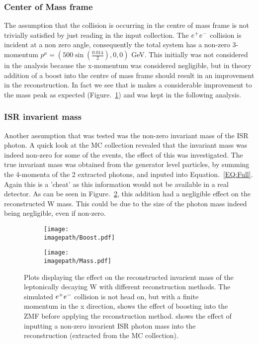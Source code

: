 \subsubsection{Center of Mass frame}
\label{SUBSUBSEC:CenterOfMassFrame}
The assumption that the collision is occurring in the centre of mass frame is not trivially satisfied by just reading in the input collection. The $e^{+}e^{-}$ collision is incident at a non zero angle, consequently the total system has a non-zero 3-momentum $ {p}^{\mu} = ( 500 \sin{(\frac{0.014}{2})}, 0, 0 )$ GeV. This initially was not considered in the analysis because the x-momentum was considered negligible, but in theory addition of a boost into the centre of mass frame should result in an improvement in the reconstruction. In fact we see that is makes a considerable improvement to the mass peak as expected (Figure.~\ref{SUBFIG:Boost}) and was kept in the following analysis.

\subsubsection{ISR invarient mass}
\label{SUBSUBSEC:ISRInvarientMass}
Another assumption that was tested was the non-zero invariant mass of the ISR photon. A quick look at the MC collection revealed that the invariant mass was indeed non-zero for some of the events, the effect of this was investigated. The true invariant mass was obtained from the generator level particles, by summing the 4-momenta of the 2 extracted photons, and inputed into Equation.~\ref{EQ:Full}. Again this is a 'cheat' as this information would not be available in a real detector. As can be seen in Figure.~\ref{SUBFIG:MassFig}, this addition had a negligible effect on the reconstructed W mass. This could be due to the size of the photon mass indeed being negligible, even if non-zero.

\begin{figure}
  \centering
  \begin{subfigure}[t]{0.45\textwidth}
    \centering
    \texttt{[image: \\imagepath/Boost.pdf]}
    \caption{}
    \label{SUBFIG:Boost}
  \end{subfigure}
  \begin{subfigure}[t]{0.45\textwidth}
    \centering
    \texttt{[image: \\imagepath/Mass.pdf]}
    \caption{}
    \label{SUBFIG:MassFig}
  \end{subfigure}
  \caption{
    Plots displaying the effect on the reconstructed invarient mass of the leptonically decaying W with different reconstruction methods.
    The simulated $e^{+}e^{-}$ collision is not head on, but with a finite momentum in the x direction,  shows the effect of boosting into the ZMF before applying the reconstruction method.
     shows the effect of inputting a non-zero invarient ISR photon mass into the reconstruction (extracted from the MC collection).
    }
  \label{FIG:BoostMass}
\end{figure}

